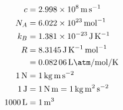\begin{align*}
c&= \SI{2.998e8}{\meter\per\second}\\
N_A&= \SI{6.022e23}{\per\mole}\\
k_B&= \SI{1.381e-23}{\joule\per\kelvin}\\
R&= \SI{8.3145}{\joule\per\kelvin\per\mole}\\
&= \SI{0.08206}{\liter\atm\per\mole\per\kelvin}\\
\SI{1}{\newton} &= \SI{1}{\kilo\gram\meter\per\second\squared}\\
\SI{1}{\joule}&= \SI{1}{\newton\meter} = \SI{1}{\kilo\gram\meter\squared\per\second\squared}\\
\SI{1000}{\liter} &= \SI{1}{\meter\cubed}\\
\end{align*}

